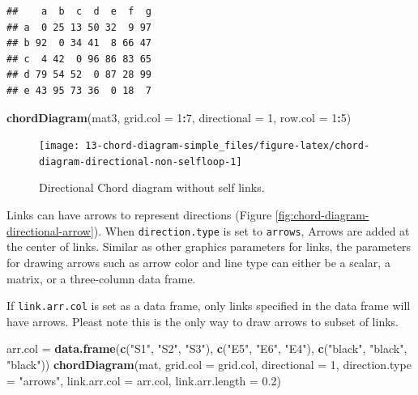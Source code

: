 \documentclass[]{book}
\newenvironment{Shaded}{\begin{snugshade}}{\end{snugshade}}
\newcommand{\KeywordTok}[1]{\textcolor[rgb]{0.13,0.29,0.53}{\textbf{#1}}}
\newcommand{\DataTypeTok}[1]{\textcolor[rgb]{0.13,0.29,0.53}{#1}}
\newcommand{\DecValTok}[1]{\textcolor[rgb]{0.00,0.00,0.81}{#1}}
\newcommand{\FloatTok}[1]{\textcolor[rgb]{0.00,0.00,0.81}{#1}}
\newcommand{\StringTok}[1]{\textcolor[rgb]{0.31,0.60,0.02}{#1}}
\newcommand{\OperatorTok}[1]{\textcolor[rgb]{0.81,0.36,0.00}{\textbf{#1}}}
\newcommand{\NormalTok}[1]{#1}
\begin{document}
\begin{verbatim}
##    a  b  c  d  e  f  g
## a  0 25 13 50 32  9 97
## b 92  0 34 41  8 66 47
## c  4 42  0 96 86 83 65
## d 79 54 52  0 87 28 99
## e 43 95 73 36  0 18  7
\end{verbatim}

\begin{Shaded}
\begin{Highlighting}[]
\KeywordTok{chordDiagram}\NormalTok{(mat3, }\DataTypeTok{grid.col =} \DecValTok{1}\OperatorTok{:}\DecValTok{7}\NormalTok{, }\DataTypeTok{directional =} \DecValTok{1}\NormalTok{, }\DataTypeTok{row.col =} \DecValTok{1}\OperatorTok{:}\DecValTok{5}\NormalTok{)}
\end{Highlighting}
\end{Shaded}

\begin{figure}

{\centering \texttt{[image: 13-chord-diagram-simple\_files/figure-latex/chord-diagram-directional-non-selfloop-1]} 

}

\caption{Directional Chord diagram without self links.}\label{fig:chord-diagram-directional-non-selfloop}
\end{figure}

Links can have arrows to represent directions (Figure
\ref{fig:chord-diagram-directional-arrow}). When \texttt{direction.type}
is set to \texttt{arrows}, Arrows are added at the center of links.
Similar as other graphics parameters for links, the parameters for
drawing arrows such as arrow color and line type can either be a scalar,
a matrix, or a three-column data frame.

If \texttt{link.arr.col} is set as a data frame, only links specified in
the data frame will have arrows. Pleast note this is the only way to
draw arrows to subset of links.

\begin{Shaded}
\begin{Highlighting}[]
\NormalTok{arr.col =}\StringTok{ }\KeywordTok{data.frame}\NormalTok{(}\KeywordTok{c}\NormalTok{(}\StringTok{"S1"}\NormalTok{, }\StringTok{"S2"}\NormalTok{, }\StringTok{"S3"}\NormalTok{), }\KeywordTok{c}\NormalTok{(}\StringTok{"E5"}\NormalTok{, }\StringTok{"E6"}\NormalTok{, }\StringTok{"E4"}\NormalTok{), }
    \KeywordTok{c}\NormalTok{(}\StringTok{"black"}\NormalTok{, }\StringTok{"black"}\NormalTok{, }\StringTok{"black"}\NormalTok{))}
\KeywordTok{chordDiagram}\NormalTok{(mat, }\DataTypeTok{grid.col =}\NormalTok{ grid.col, }\DataTypeTok{directional =} \DecValTok{1}\NormalTok{, }\DataTypeTok{direction.type =} \StringTok{"arrows"}\NormalTok{,}
    \DataTypeTok{link.arr.col =}\NormalTok{ arr.col, }\DataTypeTok{link.arr.length =} \FloatTok{0.2}\NormalTok{)}
\end{Highlighting}
\end{Shaded}
\end{document}
